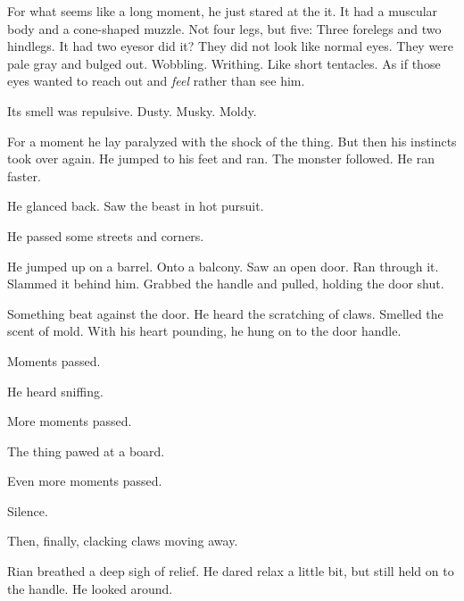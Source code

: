 For what seems like a long moment, he just stared at the it. 
It had a muscular body and a cone-shaped muzzle. 
Not four legs, but five: Three forelegs and two hindlegs. 
It had two eyes\prikker or did it?
They did not look like normal eyes. 
They were pale gray and bulged out. 
Wobbling. 
Writhing. 
Like short tentacles. 
As if those eyes wanted to reach out and \emph{feel} rather than see him. 

Its smell was repulsive. 
Dusty. 
Musky. 
Moldy. 

For a moment he lay paralyzed with the shock of the thing. 
But then his instincts took over again. 
He jumped to his feet and ran. 
The monster followed. 
He ran faster. 

He glanced back. 
Saw the beast in hot pursuit. 

He passed some streets and corners. 

He jumped up on a barrel. 
Onto a balcony. 
Saw an open door. 
Ran through it. 
Slammed it behind him. 
Grabbed the handle and pulled, holding the door shut. 

Something beat against the door. 
He heard the scratching of claws. 
Smelled the scent of mold. 
With his heart pounding, he hung on to the door handle. 

Moments passed. 

He heard sniffing. 

More moments passed. 

The thing pawed at a board. 


Even more moments passed. 

Silence. 


Then, finally, clacking claws moving away. 

Rian breathed a deep sigh of relief. 
He dared relax a little bit, but still held on to the handle. 
He looked around. 

\begin{comment}
\subsection{Rian sees living building}
\end{comment}


